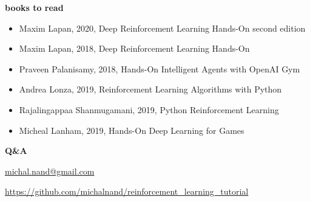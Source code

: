 \documentclass[xcolor=dvipsnames]{beamer}
\begin{document}
\begin{frame}{\bf books to read}

        \begin{itemize}
          \item Maxim Lapan, 2020, Deep Reinforcement Learning Hands-On second edition
          \item Maxim Lapan, 2018, Deep Reinforcement Learning Hands-On
          \item Praveen Palanisamy, 2018, Hands-On Intelligent Agents with OpenAI Gym
          \item Andrea Lonza, 2019, Reinforcement Learning Algorithms with Python
          \item Rajalingappaa Shanmugamani, 2019, Python Reinforcement Learning
          \item Micheal Lanham, 2019, Hands-On Deep Learning for Games
        \end{itemize}

\end{frame}


\begin{frame}{\bf Q\&A}


\url{michal.nand@gmail.com}

\url{https://github.com/michalnand/reinforcement_learning_tutorial}

 
\end{frame}
\end{document}
